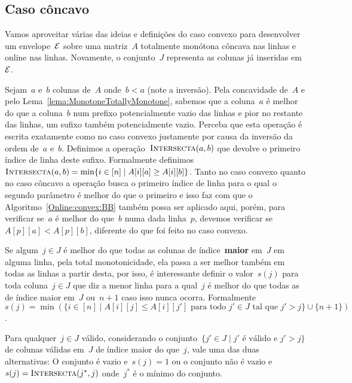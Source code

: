 
\subsection{Caso côncavo} \label{Online:concave}

Vamos aproveitar várias das ideias e definições do caso convexo para desenvolver um envelope~$\mathcal{E}$ sobre uma matriz~$A$ totalmente monótona côncava nas linhas e online nas linhas. Novamente, o conjunto~$J$ representa as colunas já inseridas em~$\mathcal{E}$.

Sejam~$a$ e~$b$ colunas de~$A$ onde~$b < a$ (note a inversão). Pela concavidade de~$A$ e pelo Lema~\ref{lema:MonotoneTotallyMonotone}, sabemos que a coluna~$a$ é melhor do que a coluna~$b$ num prefixo potencialmente vazio das linhas e pior no restante das linhas, um sufixo também potencialmente vazio. Perceba que esta operação é escrita exatamente como no caso convexo justamente por causa da inversão da ordem de~$a$ e~$b$. Definimos a operação~$\textsc{Intersecta}(a,b)$ que devolve o primeiro índice de linha deste sufixo. Formalmente definimos~$\textsc{Intersecta}(a,b) = \min\{i \in [n] \mid A[i][a] \geq A[i][b]\}$. Tanto no caso convexo quanto no caso côncavo a operação busca o primeiro índice de linha para o qual o segundo parâmetro é melhor do que o primeiro e isso faz com que o Algoritmo~\ref{Online:convex:BB} também possa ser aplicado aqui, porém, para verificar se~$a$ é melhor do que~$b$ numa dada linha~$p$, devemos verificar se~${ A[p][a] < A[p][b] }$, diferente do que foi feito no caso convexo.

Se algum~$j \in J$ é melhor do que todas as colunas de índice~\textbf{maior} em~$J$ em alguma linha, pela total monotonicidade, ela passa a ser melhor também em todas as linhas a partir desta, por isso, é interessante definir o valor~$s(j)$ para toda coluna~$j \in J$ que diz a menor linha para a qual~$j$ é melhor do que todas as de índice maior em~$J$ ou~$n+1$ caso isso nunca ocorra. Formalmente~${ s(j) = \min(\{i \in [n] \mid A[i][j] \leq A[i][j'] \text{ para todo } j' \in J \text{ tal que } j' > j\} \cup \{n+1\}) }$.

\begin{prop} \label{Online:concave:easys}
Para qualquer~$j \in J$ válido, considerando o conjunto~${ \{j' \in J \mid j' \text{ é válido e } j' > j\} }$ de colunas válidas em~$J$ de índice maior do que~$j$, vale uma das duas alternativas: O conjunto é vazio e~${ s(j) = 1 }$ ou o conjunto não é vazio e~${ s(j) = \textsc{Intersecta}(j^*,j) }$ onde~$j^*$ é o mínimo do conjunto.
\end{prop}

